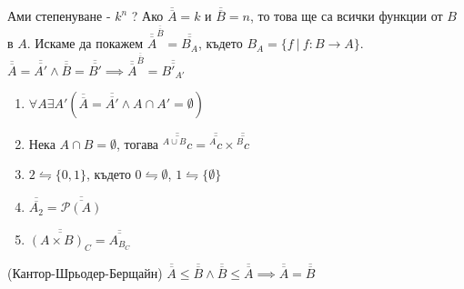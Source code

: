 \documentclass[fleqn, titlepage, 12pt]{report}
\begin{document}
 Ами степенуване - $k^n$ ? Ако $\overline{\overline{A}} = k$ и $\overline{\overline{B}} = n$,
то това ще са всички функции от $B$ в $A$.
Искаме да покажем $\overline{\overline{A}}^{\overline{\overline{B}}} = \overline{\overline{B_A}}$,
където $B_A = \{f\ |\ f: B \rightarrow A\}$.
$\overline{\overline{A}} = \overline{\overline{A'}} \land \overline{\overline{B}} = \overline{\overline{B'}} \implies
\overline{\overline{A}}^{\overline{\overline{B}}} = \overline{\overline{{B'}_{A'}}}$\\
\bigbreak

\begin{enumerate}
  \item $\forall{A}\exists{A'}(\overline{\overline{A}} = \overline{\overline{A'}} \land A \cap A' = \emptyset)$
  \item Нека $A \cap B = \emptyset$, тогава $ \overline{\overline{^{A \cup B}c}} = \overline{\overline{^A c}} \times  \overline{\overline{^B c}}$
  \item $2 \leftrightharpoons \{ 0, 1 \}$, където $0 \leftrightharpoons \emptyset$, $1 \leftrightharpoons \{ \emptyset \}$
  \item $\overline{\overline{A_2}} = \overline{\overline{\mathcal{P}(A)}}$
  \item $\overline{\overline{{(A \times B)}_C}} = \overline{\overline{{A}_{B_C}}}$
\end{enumerate}

 (Кантор-Шрьодер-Берщайн)
$\overline{\overline{A}} \leq \overline{\overline{B}} \land \overline{\overline{B}} \leq \overline{\overline{A}}
\implies \overline{\overline{A}} = \overline{\overline{B}}$
\bigbreak
\end{document}
